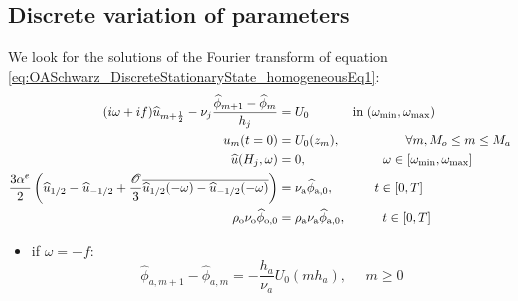 \begin{appendix}
\section{Discrete variation of parameters}
\label{sec:OASchwarz_appendix_discreteVariationParameters}
We look for the solutions of the Fourier transform of equation
\eqref{eq:OASchwarz_DiscreteStationaryState_homogeneousEq1}:
\begin{subequations}
	\begin{align}
	(i\omega + if) \widehat{u}_{m+\frac{1}{2}} -
		\nu_j \frac{\widehat{\phi}_{m+1} -
		\widehat{\phi}_m}{h_j}
		&=U_0
	\hspace{1.2cm} \mbox{in}\;
	(\omega_{\min},\omega_{\max})
		\label{eq:OASchwarz_appendix_eqFourier}\\
		u_m(t=0) &= U_0(z_m),   \hspace{1.8cm}
		\forall m, M_o \leq m \leq M_a \\
		\widehat{u}(H_j, \omega) &= 0,
		\hspace{2.1cm}
		\omega \in [\omega_{\min},\omega_{\max}]
		\label{eq:OASchwarz_appendix_bdCond}\\
		\frac{3\alpha^e}{2} 
		\left( \widehat{u}_{1/2} - \widehat{u}_{-1/2}
		+ \frac{{\cal O}}{3} \overline{
		\widehat{u}_{1/2}(-\omega) -
		\widehat{u}_{-1/2}(-\omega)} \right) &=
		\nu_{\rm a}\widehat{\phi}_{\rm a, 0},
		\hspace{1.12cm} t \in [0,T]\\
		\rho_{\rm o} \nu_{\rm o}\widehat{\phi}_{\rm o, 0}
		&= \rho_{\rm a} \nu_{\rm a}\widehat{\phi}_{\rm a, 0},
		\hspace{1.0cm} t \in [0,T]
		\end{align}
		\end{subequations}
\begin{itemize}
\item if $\omega=-f$:
	\begin{equation}
		\widehat{\phi}_{a, m+1} - \widehat{\phi}_{a,m} =
		-\frac{h_a}{\nu_a} U_0(m h_a), ~~~~~~ m \geq 0
	\end{equation}

\end{itemize}
\end{appendix}
